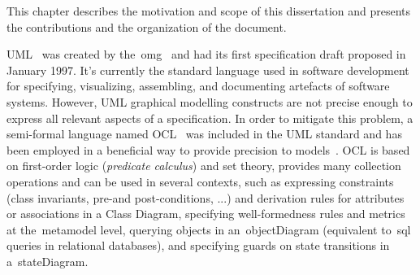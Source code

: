 \newcommand{\novathesis}{\emph{novathesis}}
\newcommand{\novathesisclass}{\texttt{novathesis.cls}}


{This chapter describes the motivation and scope of this dissertation and presents the contributions and the organization of the document.}


UML~\cite{uml2005} was created by the~\gls{omg}~\cite{omg2017} and had its first specification draft proposed in January 1997. It's currently the standard language used in software development for specifying, visualizing, assembling, and documenting artefacts of software systems. However, UML graphical modelling constructs are not precise enough to express all relevant aspects of a specification. In order to mitigate this problem, a semi-formal language named OCL~\cite{ocl2014} was included in the UML standard and has been employed in a beneficial way to provide precision to models~\cite{Gogolla2004}. OCL is based on first-order logic (\emph{predicate calculus}) and set theory, provides many collection operations and can be used in several contexts, such as expressing constraints (class invariants, pre-and post-conditions, ...) and derivation rules for attributes or associations in a Class Diagram, specifying well-formedness rules and metrics at the~\gls{metamodel} level, querying objects in an~\gls{objectDiagram} (equivalent to~\gls{sql} queries in relational databases), and specifying guards on state transitions in a~\gls{stateDiagram}.

